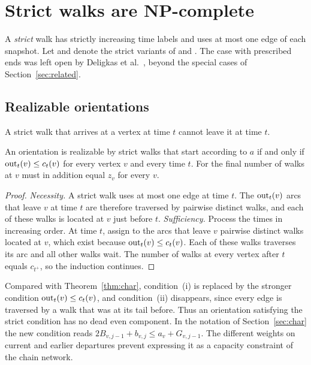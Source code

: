 \section{Strict walks are NP-complete}\label{sec:strict}

A \emph{strict} walk has strictly increasing time labels and uses at most one edge of each snapshot. Let \SFIX{} and \SFREE{} denote the strict variants of \FIX{} and \FREE{}. The case with prescribed ends was left open by Deligkas et al.~\cite[p.~26504]{deligkas2025}, beyond the special cases of Section~\ref{sec:related}.

\subsection{Realizable orientations}

A strict walk that arrives at a vertex at time $t$ cannot leave it at time $t$.

\begin{lemma}\label{lem:strict}
An orientation is realizable by strict walks that start according to $a$ if and only if $\mathrm{out}_t(v)\le c_t(v)$ for every vertex $v$ and every time $t$. For \SFIX{} the final number of walks at $v$ must in addition equal $z_v$ for every $v$.
\end{lemma}

\begin{proof}
\emph{Necessity.} A strict walk uses at most one edge at time $t$. The $\mathrm{out}_t(v)$ arcs that leave $v$ at time $t$ are therefore traversed by pairwise distinct walks, and each of these walks is located at $v$ just before $t$. \emph{Sufficiency.} Process the times in increasing order. At time $t$, assign to the arcs that leave $v$ pairwise distinct walks located at $v$, which exist because $\mathrm{out}_t(v)\le c_t(v)$. Each of these walks traverses its arc and all other walks wait. The number of walks at every vertex after $t$ equals $c_{t^+}$, so the induction continues.
\end{proof}

Compared with Theorem~\ref{thm:char}, condition~(i) is replaced by the stronger condition $\mathrm{out}_t(v)\le c_t(v)$, and condition~(ii) disappears, since every edge is traversed by a walk that was at its tail before. Thus an orientation satisfying the strict condition has no dead even component. In the notation of Section~\ref{sec:char} the new condition reads $2B_{v,j-1}+b_{v,j}\le a_v+G_{v,j-1}$. The different weights on current and earlier departures prevent expressing it as a capacity constraint of the chain network.

